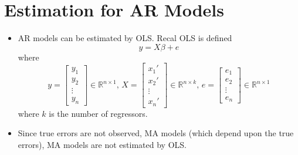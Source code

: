 \documentclass[11pt]{article}
\begin{document}
\section{Estimation for AR Models}
\begin{itemize}
    \item AR models can be estimated by OLS. Recal OLS is defined
    \[y = X\beta + e\]
    where 
    \[
    y = \begin{bmatrix}
        y_1 \\
        y_2 \\
        \vdots \\
        y_n
    \end{bmatrix} \in \mathbb{R}^{n \times 1}, \,
    X = \begin{bmatrix}
        x_1' \\
        x_2' \\
        \vdots \\
        x_n'
    \end{bmatrix} \in \mathbb{R}^{n \times k}, \, 
    e = \begin{bmatrix}
        e_1 \\
        e_2 \\
        \vdots \\
        e_n
    \end{bmatrix} \in \mathbb{R}^{n \times 1}
    \]
    where $k$ is the number of regressors.   

    \item Since true errors are not observed, MA models (which depend upon the true errors), MA 
    models are not estimated by OLS. 
\end{itemize}
\end{document}

